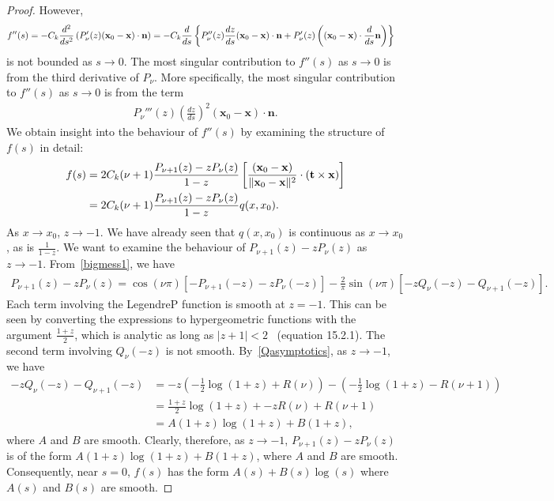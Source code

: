 \begin{proof}
However,
\begin{align*} 
  f''(s) &= -C_k \frac{d^2}{ds^2}\left( P'_\nu(z) 
  (\mathbf{x}_{0}-\mathbf{x}) \cdot \mathbf{n} \right) = 
    -C_{k}\frac{d}{ds}\left\{P''_{\nu}(z) \frac{dz}{ds}
    (\mathbf{x}_{0}-\mathbf{x})  \cdot \mathbf{n} + 
    P'_\nu(z)\left((\mathbf{x}_{0} -
    \mathbf{x}) \cdot \frac{d}{ds}\mathbf{n}\right)\right\}
\end{align*}
is not bounded as $s\rightarrow 0$. The most singular contribution to
$f''(s)$ as $s\rightarrow 0$ is from the third derivative of $P_{\nu}$.
More specifically, the most singular contribution to $f''(s)$ as
$s\rightarrow 0$ is from the term 
\begin{align*}
  P_{\nu}'''(z) \left(\frac{dz}{ds}\right)^2 
    (\mathbf{x}_{0}-\mathbf{x}) \cdot \mathbf{n}.
\end{align*}
We obtain insight into the behaviour of $f''(s)$ by examining the
structure of $f(s)$ in detail:
\begin{align*}
  f(s) &= 2C_k(\nu+1)\frac{P_{\nu+1}(z)-zP_{\nu}(z)}{1-z} \left[
  \frac{(\mathbf{x}_{0}-\mathbf{x})}{\|\mathbf{x}_{0}-\mathbf{x}\|^2}
  \cdot \left( \mathbf{t} \times \mathbf{x} \right)\right] \\
  &= 2C_k(\nu+1)\frac{P_{\nu+1}(z)-zP_{\nu}(z)}{1-z} q(x,x_0).
\end{align*}
As $x\rightarrow x_{0}$, $z \rightarrow -1.$ We have already seen that
$q(x,x_{0})$ is continuous  as
$x\rightarrow x_0$, as is $\frac{1}{1-z}$.  We want to examine the
behaviour of $P_{\nu+1}(z) - zP_{\nu}(z)$ as $z\rightarrow -1$.
From~\eqref{bigmess1}, we have
\begin{align*}
  P_{\nu+1}(z)-zP_{\nu}(z)
  = \cos(\nu \pi)\left[-P_{\nu+1}(-z) - zP_{\nu}(-z) \right] 
  -\frac{2}{\pi}\sin(\nu \pi)\left[-zQ_{\nu}(-z) - Q_{\nu+1}(-z) \right].
\end{align*}
Each term involving the LegendreP function is smooth at $z = -1$.  This
can be seen by converting the expressions to hypergeometric functions
with the argument $\frac{1+z}{2}$, which is analytic as long as $|z+1|
< 2$~\cite{fatAbramowitz} (equation 15.2.1).  The second term involving
$Q_{\nu}(-z)$ is not smooth.  By~\eqref{Qasymptotics}, as $z
\rightarrow -1$, we have
\begin{align*}
  -zQ_{\nu}(-z) - Q_{\nu+1}(-z) &= -z\left(
    -\frac{1}{2}\log(1+z) + R(\nu)\right) - 
    \left(-\frac{1}{2}\log(1+z) - R(\nu+1)\right) \\
  &= \frac{1+z}{2}\log(1+z) + -zR(\nu) + R(\nu+1) \\
  &= A(1+z)\log(1+z) + B(1+z),
\end{align*}
where $A$ and $B$ are smooth.  Clearly, therefore, as $z\rightarrow
-1$, $P_{\nu+1}(z) -z P_{\nu}(z)$ is of the form $A(1+z) \log(1+z) +
B(1+z)$, where $A$ and $B$ are smooth.  Consequently, near $s=0$,
$f(s)$ has the form $A(s) + B(s) \log(s)$ where $A(s)$ and $B(s)$ are
smooth.
\end{proof}
